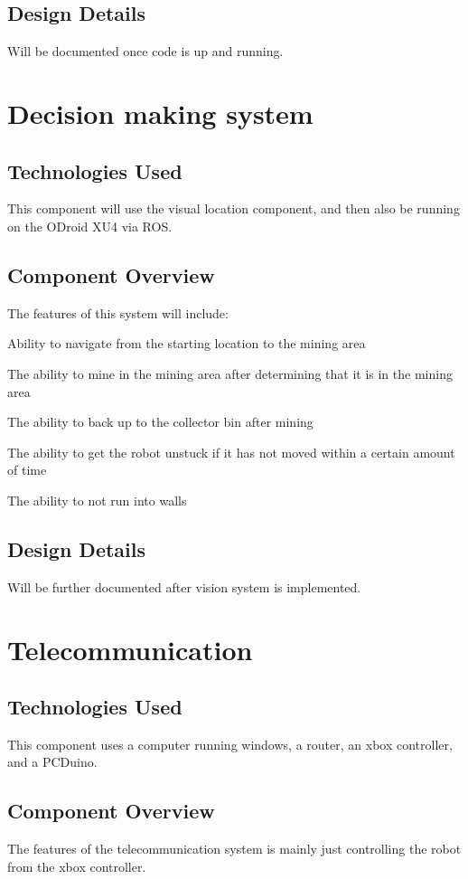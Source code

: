 \subsection{Design Details}
Will be documented once code is up and running.


\section{Decision making system}

\subsection{Technologies  Used}
This component will use the visual location component, and then also be running on the ODroid XU4 via ROS. 


\subsection{Component  Overview}
The features of this system will include:
\itemize
\item{Ability to navigate from the starting location to the mining area}
\item{The ability to mine in the mining area after determining that it is in the mining area}
\item{The ability to back up to the collector bin after mining}
\item{The ability to get the robot unstuck if it has not moved within a certain amount of time}
\item{The ability to not run into walls}
\enditemize


\subsection{Design Details}
Will be further documented after vision system is implemented.


\section{Telecommunication }

\subsection{Technologies  Used}
This component uses a computer running windows, a router, an xbox controller, and a PCDuino. 

\subsection{Component  Overview}
The features of the telecommunication system is mainly just controlling the robot from the xbox controller.

